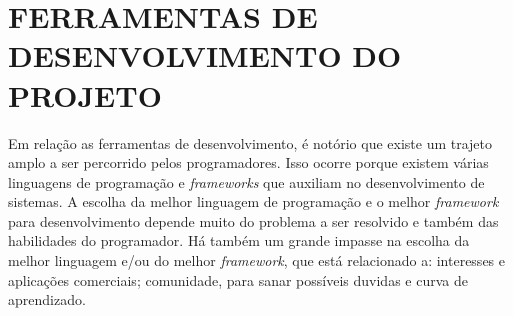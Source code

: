\section{{FERRAMENTAS DE DESENVOLVIMENTO DO PROJETO}}

Em relação as ferramentas de desenvolvimento, é notório que existe um trajeto amplo a ser percorrido pelos programadores. Isso ocorre porque existem várias linguagens de programação e \textit{frameworks} que auxiliam no desenvolvimento de sistemas. A escolha da melhor linguagem de programação e o melhor \textit{framework} para desenvolvimento depende muito do problema a ser resolvido e também das habilidades do programador. Há também um grande impasse na escolha da melhor linguagem e/ou do melhor \textit{framework}, que está relacionado a: interesses e aplicações comerciais; comunidade, para sanar possíveis duvidas e curva de aprendizado.







